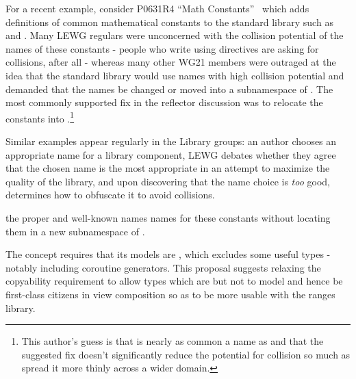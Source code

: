 For a recent example, consider P0631R4 ``Math Constants''~\cite{P0631R4} which
adds definitions of common mathematical constants to the standard library such
as  and . Many LEWG regulars were unconcerned with the
collision potential of the names of these constants - people who write using
directives are asking for collisions, after all - whereas many other WG21
members were outraged at the idea that the standard library would use names with
high collision potential and demanded that the names be changed or moved into
a subnamespace of . The most commonly supported fix in the reflector
discussion was to relocate the constants into .\footnote{This
author's guess is that  is nearly as common a name as  and
that the suggested fix doesn't significantly reduce the potential for collision
so much as spread it more thinly across a wider domain.}

Similar examples appear regularly in the Library groups: an author chooses an
appropriate name for a library component, LEWG debates whether they agree that
the chosen name is the most appropriate in an attempt to maximize the quality of
the library, and upon discovering that the name choice is \emph{too} good,
determines how to obfuscate it to avoid collisions.


the proper
and well-known names names for these constants without locating them in a new
subnamespace of .

The  concept requires that its models are ,
which excludes some useful  types -
notably including coroutine generators.
This proposal suggests relaxing the copyability requirement
to allow  types which are
 but not 
to model  and hence be
first-class citizens in view composition so as to
be more usable with the ranges library.

